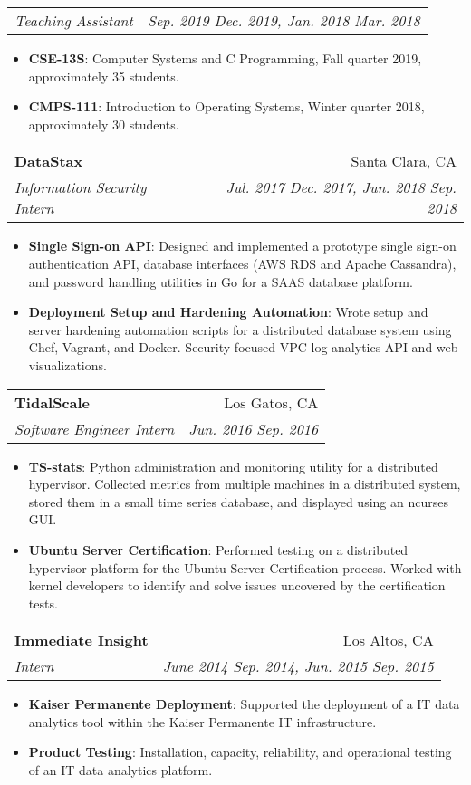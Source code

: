 \documentclass[letterpaper,10pt,oneside]{memoir}
\makeatletter
\newcommand{\resumeItem}[2]{
  \item\small{
    \textbf{#1}{: #2}
  }
}
\newcommand{\resumeSubheading}[4]{
  \vspace{1pt}%
    \begin{tabular*}{0.99\textwidth}[t]{l@{\extracolsep{\fill}}r}
      \textbf{#1} & #2 \\
      \textit{\small #3} & \textit{\small #4} \\
    \end{tabular*}
}
\newcommand{\resumeSubheadingContinue}[2]{
  \vspace{-1pt}
    \begin{tabular*}{0.99\textwidth}[t]{l@{\extracolsep{\fill}}r}
      \textit{\small #1} & \textit{\small #2} \\
    \end{tabular*}
}
\newcommand{\resumeItemListStart}{\begin{itemize}[noitemsep,nolistsep]}
\newcommand{\resumeItemListEnd}{\end{itemize}}
\makeatother
\begin{document}
    \resumeSubheadingContinue
      {Teaching Assistant}{Sep. 2019 \textemdash{} Dec. 2019, Jan. 2018 \textemdash{} Mar. 2018}
      \resumeItemListStart
        \resumeItem{CSE-13S}
          {Computer Systems and C Programming, Fall quarter 2019, approximately 35 students.}
        \resumeItem{CMPS-111}
          {Introduction to Operating Systems, Winter quarter 2018, approximately 30 students.}
      \resumeItemListEnd

    \resumeSubheading
      {DataStax}{Santa Clara, CA}
      {Information Security Intern }{ Jul. 2017 \textemdash{} Dec. 2017, Jun. 2018 \textemdash{} Sep. 2018}
      \resumeItemListStart
        \resumeItem{Single Sign-on API}
	  {Designed and implemented a prototype single sign-on authentication API, database interfaces (AWS RDS and Apache Cassandra), and password handling utilities in Go for a SAAS database platform.}
        \resumeItem{Deployment Setup and Hardening Automation}
          {Wrote setup and server hardening automation scripts for a distributed database system using Chef, Vagrant, and Docker. Security focused VPC log analytics API and web visualizations.}
      \resumeItemListEnd

    \resumeSubheading
      {TidalScale}{Los Gatos, CA}
      {Software Engineer Intern}{Jun. 2016 \textemdash{} Sep. 2016}
      \resumeItemListStart
        \resumeItem{TS-stats}
          {Python administration and monitoring utility for a distributed hypervisor. Collected metrics from multiple machines in a distributed system, stored them in a small time series database, and displayed using an ncurses GUI.}
        \resumeItem{Ubuntu Server Certification}
	  {Performed testing on a distributed hypervisor platform for the Ubuntu Server Certification process. Worked with kernel developers to identify and solve issues uncovered by the certification tests.}
      \resumeItemListEnd

    \resumeSubheading
      {Immediate Insight}{Los Altos, CA}
      {Intern}{June 2014 \textemdash{} Sep. 2014, Jun. 2015 \textemdash{} Sep. 2015}
      \resumeItemListStart
        \resumeItem{Kaiser Permanente Deployment}
	  {Supported the deployment of a IT data analytics tool within the Kaiser Permanente IT infrastructure.}
        \resumeItem{Product Testing}
          {Installation, capacity, reliability, and operational testing of an IT data analytics platform.}
      \resumeItemListEnd

\end{document}
